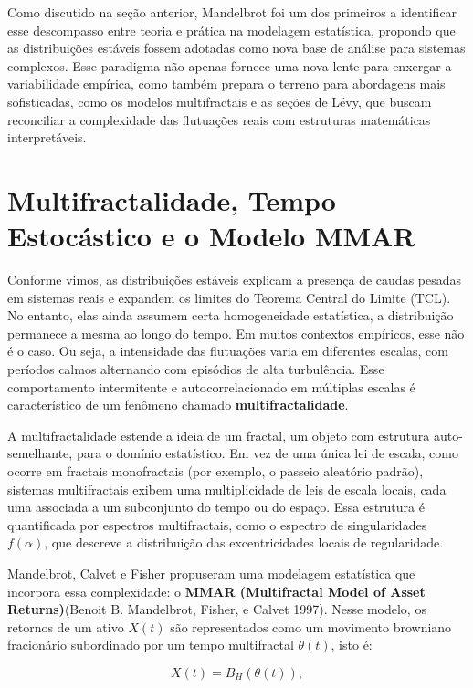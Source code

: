 \documentclass[
  letterpaper,
  DIV=11,
  numbers=noendperiod]{scrartcl}
\begin{document}
Como discutido na seção anterior, Mandelbrot foi um dos primeiros a
identificar esse descompasso entre teoria e prática na modelagem
estatística, propondo que as distribuições estáveis fossem adotadas como
nova base de análise para sistemas complexos. Esse paradigma não apenas
fornece uma nova lente para enxergar a variabilidade empírica, como
também prepara o terreno para abordagens mais sofisticadas, como os
modelos multifractais e as seções de Lévy, que buscam reconciliar a
complexidade das flutuações reais com estruturas matemáticas
interpretáveis.

\section{Multifractalidade, Tempo Estocástico e o Modelo
MMAR}\label{multifractalidade-tempo-estocuxe1stico-e-o-modelo-mmar}

Conforme vimos, as distribuições estáveis explicam a presença de caudas
pesadas em sistemas reais e expandem os limites do Teorema Central do
Limite (TCL). No entanto, elas ainda assumem certa homogeneidade
estatística, a distribuição permanece a mesma ao longo do tempo. Em
muitos contextos empíricos, esse não é o caso. Ou seja, a intensidade
das flutuações varia em diferentes escalas, com períodos calmos
alternando com episódios de alta turbulência. Esse comportamento
intermitente e autocorrelacionado em múltiplas escalas é característico
de um fenômeno chamado \textbf{multifractalidade}.

A multifractalidade estende a ideia de um fractal, um objeto com
estrutura auto-semelhante, para o domínio estatístico. Em vez de uma
única lei de escala, como ocorre em fractais monofractais (por exemplo,
o passeio aleatório padrão), sistemas multifractais exibem uma
multiplicidade de leis de escala locais, cada uma associada a um
subconjunto do tempo ou do espaço. Essa estrutura é quantificada por
espectros multifractais, como o espectro de singularidades
\(f(\alpha)\), que descreve a distribuição das excentricidades locais de
regularidade.

Mandelbrot, Calvet e Fisher propuseram uma modelagem estatística que
incorpora essa complexidade: o \textbf{MMAR (Multifractal Model of Asset
Returns)}(Benoit B. Mandelbrot, Fisher, e Calvet 1997). Nesse modelo, os
retornos de um ativo \(X(t)\) são representados como um movimento
browniano fracionário subordinado por um tempo multifractal
\(\theta(t)\), isto é:

\[
X(t) = B_H(\theta(t)),
\]
\end{document}
